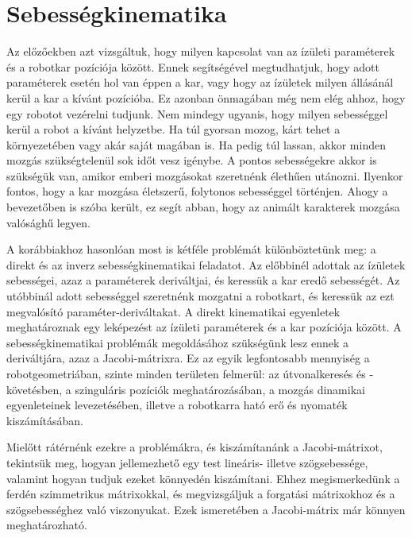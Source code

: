 \documentclass[12pt,a4paper]{report}
\theoremstyle{remark}
\theoremstyle{definition}
\begin{document}
\chapter{Sebességkinematika}
Az előzőekben azt vizsgáltuk, hogy milyen kapcsolat van az ízületi paraméterek és a robotkar pozíciója között. Ennek 
segítségével megtudhatjuk, hogy adott paraméterek esetén hol van éppen a kar, vagy hogy az ízületek milyen állásánál 
kerül a kar a kívánt pozícióba. Ez azonban önmagában még nem elég ahhoz, hogy egy robotot vezérelni tudjunk. Nem 
mindegy ugyanis, hogy milyen sebességgel kerül a robot a kívánt helyzetbe. Ha túl gyorsan mozog, kárt tehet a 
környezetében vagy akár saját magában is. Ha pedig túl lassan, akkor minden mozgás szükségtelenül sok időt vesz 
igénybe. A pontos sebességekre akkor is szükségük van, amikor emberi mozgásokat szeretnénk élethűen utánozni. 
Ilyenkor fontos, hogy a kar mozgása életszerű, folytonos sebességgel történjen. Ahogy a bevezetőben is szóba került, 
ez segít abban, hogy az animált karakterek mozgása valósághű legyen.

A korábbiakhoz hasonlóan most is kétféle problémát különböztetünk meg: a direkt és az inverz sebességkinematikai 
feladatot. Az előbbinél adottak az ízületek sebességei, azaz a paraméterek deriváltjai, és keressük a kar eredő 
sebességét. Az utóbbinál adott sebességgel szeretnénk mozgatni a robotkart, és keressük az ezt megvalósító 
paraméter-deriváltakat. A direkt kinematikai egyenletek meghatároznak egy leképezést az ízületi paraméterek és a kar 
pozíciója között. A sebességkinematikai problémák megoldásához szükségünk lesz ennek a deriváltjára, azaz a 
Jacobi-mátrixra. Ez az egyik legfontosabb mennyiség a robotgeometriában, szinte minden területen felmerül: az 
útvonalkeresés és -követésben, a szinguláris pozíciók meghatározásában, a mozgás dinamikai egyenleteinek 
levezetésében, illetve a robotkarra ható erő és nyomaték kiszámításában.

Mielőtt rátérnénk ezekre a problémákra, és kiszámítanánk a Jacobi-mátrixot, tekintsük meg, hogyan 
jellemezhető egy test lineáris- illetve szögsebessége, valamint hogyan tudjuk ezeket könnyedén kiszámítani. Ehhez 
megismerkedünk a ferdén szimmetrikus mátrixokkal, és megvizsgáljuk a forgatási mátrixokhoz és a szögsebességhez való 
viszonyukat. Ezek ismeretében a Jacobi-mátrix már könnyen meghatározható.
\end{document}
